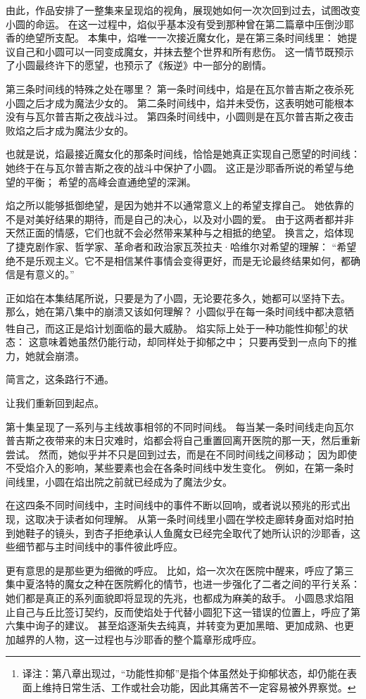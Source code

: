 由此，作品安排了一整集来呈现焰的视角，展现她如何一次次回到过去，试图改变小圆的命运。
在这一过程中，焰似乎基本没有受到那种曾在第二篇章中压倒沙耶香的绝望所支配。
本集中，焰唯一一次接近魔女化，是在第三条时间线里：
她提议自己和小圆可以一同变成魔女，并抹去整个世界和所有悲伤。
这一情节既预示了小圆最终许下的愿望，也预示了《叛逆》中一部分的剧情。

第三条时间线的特殊之处在哪里？
第一条时间线中，焰是在瓦尔普吉斯之夜杀死小圆之后才成为魔法少女的。
第二条时间线中，焰并未受伤，这表明她可能根本没有与瓦尔普吉斯之夜战斗过。
第四条时间线中，小圆则是在瓦尔普吉斯之夜击败焰之后才成为魔法少女的。

也就是说，焰最接近魔女化的那条时间线，恰恰是她真正实现自己愿望的时间线：
她终于在与瓦尔普吉斯之夜的战斗中保护了小圆。
这正是沙耶香所说的希望与绝望的平衡；
希望的高峰会直通绝望的深渊。

焰之所以能够抵御绝望，是因为她并不以通常意义上的希望支撑自己。
她依靠的不是对美好结果的期待，而是自己的决心，以及对小圆的爱。
由于这两者都并非天然正面的情感，它们也就不会必然带来某种与之相抵的绝望。
换言之，焰体现了捷克剧作家、哲学家、革命者和政治家瓦茨拉夫·哈维尔对希望的理解：
“希望绝不是乐观主义。它不是相信某件事情会变得更好，而是无论最终结果如何，都确信是有意义的。”
\cite{ref64}

正如焰在本集结尾所说，只要是为了小圆，无论要花多久，她都可以坚持下去。
那么，她在第八集中的崩溃又该如何理解？
小圆似乎在每一条时间线中都决意牺牲自己，而这正是焰计划面临的最大威胁。
焰实际上处于一种功能性抑郁\footnote{%
    译注：第八章出现过，“功能性抑郁”是指个体虽然处于抑郁状态，却仍能在表面上维持日常生活、工作或社会功能，因此其痛苦不一定容易被外界察觉。
}的状态：
这意味着她虽然仍能行动，却同样处于抑郁之中；
只要再受到一点向下的推力，她就会崩溃。

简言之，这条路行不通。

让我们重新回到起点。

第十集呈现了一系列与主线故事相邻的不同时间线。
每当某一条时间线走向瓦尔普吉斯之夜带来的末日灾难时，焰都会将自己重置回离开医院的那一天，然后重新尝试。
然而，她似乎并不只是回到过去，而是在不同时间线之间移动；
因为即使不受焰介入的影响，某些要素也会在各条时间线中发生变化。
例如，在第一条时间线里，小圆在焰出院之前就已经成为了魔法少女。

在这四条不同时间线中，主时间线中的事件不断以回响，或者说以预兆的形式出现，这取决于读者如何理解。
从第一条时间线里小圆在学校走廊转身面对焰时拍到她鞋子的镜头，到杏子拒绝承认人鱼魔女已经完全取代了她所认识的沙耶香，这些细节都与主时间线中的事件彼此呼应。

更有意思的是那些更为细微的呼应。
比如，焰一次次在医院中醒来，呼应了第三集中夏洛特的魔女之种在医院孵化的情节，也进一步强化了二者之间的平行关系：
她们都是真正的系列面貌即将显现的先兆，也都成为麻美的敌手。
小圆恳求焰阻止自己与丘比签订契约，反而使焰处于代替小圆犯下这一错误的位置上，呼应了第六集中询子的建议。
甚至焰逐渐失去纯真，并转变为更加黑暗、更加成熟、也更加越界的人物，这一过程也与沙耶香的整个篇章形成呼应。

